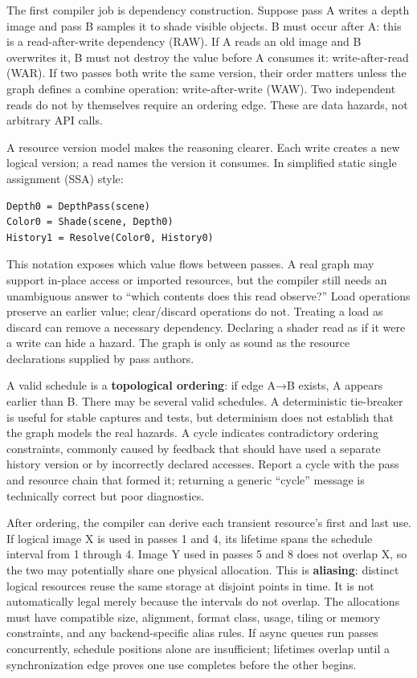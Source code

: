 The first compiler job is dependency construction. Suppose pass A writes a depth image and pass B samples it to shade visible objects. B must occur after A: this is a read-after-write dependency (RAW). If A reads an old image and B overwrites it, B must not destroy the value before A consumes it: write-after-read (WAR). If two passes both write the same version, their order matters unless the graph defines a combine operation: write-after-write (WAW). Two independent reads do not by themselves require an ordering edge. These are data hazards, not arbitrary API calls.

A resource version model makes the reasoning clearer. Each write creates a new logical version; a read names the version it consumes. In simplified static single assignment (SSA) style:

\begin{verbatim}
Depth0 = DepthPass(scene)
Color0 = Shade(scene, Depth0)
History1 = Resolve(Color0, History0)
\end{verbatim}

This notation exposes which value flows between passes. A real graph may support in-place access or imported resources, but the compiler still needs an unambiguous answer to ``which contents does this read observe?'' Load operations preserve an earlier value; clear/discard operations do not. Treating a load as discard can remove a necessary dependency. Declaring a shader read as if it were a write can hide a hazard. The graph is only as sound as the resource declarations supplied by pass authors.

A valid schedule is a \textbf{topological ordering}: if edge A→B exists, A appears earlier than B. There may be several valid schedules. A deterministic tie-breaker is useful for stable captures and tests, but determinism does not establish that the graph models the real hazards. A cycle indicates contradictory ordering constraints, commonly caused by feedback that should have used a separate history version or by incorrectly declared accesses. Report a cycle with the pass and resource chain that formed it; returning a generic ``cycle'' message is technically correct but poor diagnostics.

After ordering, the compiler can derive each transient resource's first and last use. If logical image X is used in passes 1 and 4, its lifetime spans the schedule interval from 1 through 4. Image Y used in passes 5 and 8 does not overlap X, so the two may potentially share one physical allocation. This is \textbf{aliasing}: distinct logical resources reuse the same storage at disjoint points in time. It is not automatically legal merely because the intervals do not overlap. The allocations must have compatible size, alignment, format class, usage, tiling or memory constraints, and any backend-specific alias rules. If async queues run passes concurrently, schedule positions alone are insufficient; lifetimes overlap until a synchronization edge proves one use completes before the other begins.

